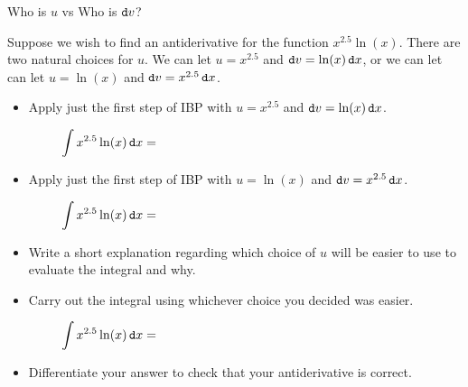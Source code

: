 \begin{exercise}{Who is $u$ vs Who is $\mathop{}\!\mathtt{d} v$? \Coffeecup \Coffeecup}

Suppose we wish to find an antiderivative for the function $x^{2.5}\ln(x)$.  There are two natural choices for $u$.  We can let $u=x^{2.5}$ and $\mathop{}\!\mathtt{d} v=\ln(x)\mathop{}\!\mathtt{d} x$, or we can let can let $u=\ln(x)$ and $\mathop{}\!\mathtt{d} v=x^{2.5}\mathop{}\!\mathtt{d} x$.

\begin{itemize}
\item Apply just the first step of IBP with $u=x^{2.5}$ and $\mathop{}\!\mathtt{d} v=\ln(x)\mathop{}\!\mathtt{d} x$.

$$\int x^{2.5}\ln(x) \dif x = \hspace{3in}$$

\item Apply just the first step of IBP with $u=\ln(x)$ and $\mathop{}\!\mathtt{d} v=x^{2.5}\mathop{}\!\mathtt{d} x$.

$$\int x^{2.5}\ln(x) \dif x = \hspace{3in}$$

\item Write a short explanation regarding which choice of $u$ will be easier to use to evaluate the integral and why.

\item Carry out the integral using whichever choice you decided was easier.

$$\int x^{2.5}\ln(x) \dif x = \hspace{3in}$$

\item Differentiate your answer to check that your antiderivative is correct.

\end{itemize}
\end{exercise}
